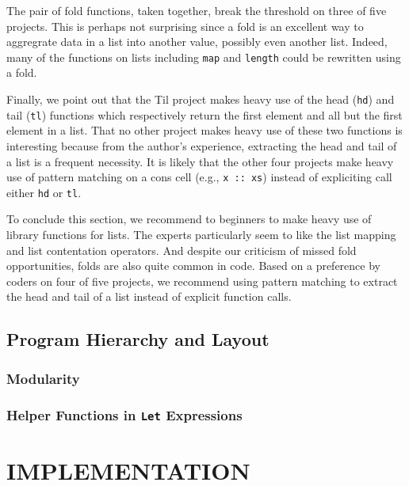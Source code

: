 \documentclass[12pt,abstracton]{scrartcl}
\begin{document}
The pair of fold functions, taken together, break the threshold on three of five projects.
This is perhaps not surprising since a fold is an excellent way to aggregrate data in a list
into another value, possibly even another list. Indeed, many of the functions on lists
including \texttt{map} and \texttt{length} could be rewritten using a fold.

Finally, we point out that the Til project makes heavy use of the head (\texttt{hd}) and tail (\texttt{tl})
functions which respectively return the first element and all but the first element in a list.
That no other project makes heavy use of these two functions is interesting because from
the author's experience, extracting the head and tail of a list is a frequent necessity.
It is likely that the other four projects make heavy use of pattern matching on a cons cell (e.g., \texttt{x :: xs})
instead of expliciting call either \texttt{hd} or \texttt{tl}.

To conclude this section, we recommend to beginners to make heavy use of library functions
for lists. The experts particularly seem to like the list mapping and list contentation operators.
And despite our criticism of missed fold opportunities, folds are also quite common in code.
Based on a preference by coders on four of five projects, we recommend using pattern
matching to extract the head and tail of a list instead of explicit function calls.
\subsection{Program Hierarchy and Layout}\label{subsec:struct}
\subsubsection{Modularity}\label{subsubsec:modularity}
\subsubsection{Helper Functions in \texttt{Let} Expressions}\label{subsubsec:let}
\section{IMPLEMENTATION}\label{sec:impl}
\end{document}
